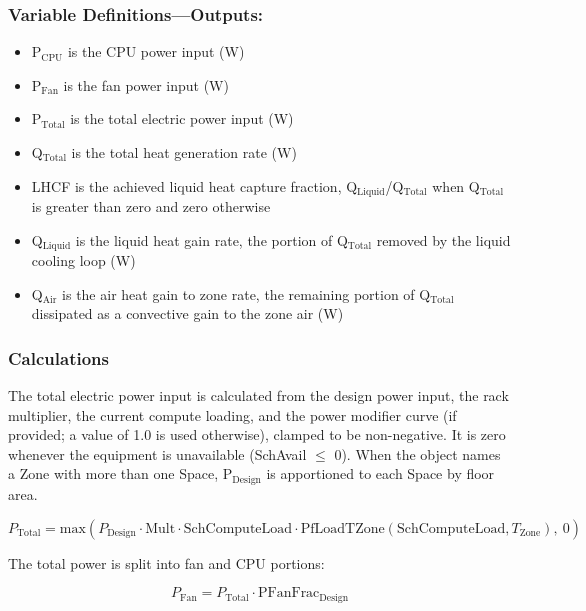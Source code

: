 \subsubsection{Variable Definitions---Outputs:}\label{variable-definitions-outputs-liquidcooled}

\begin{itemize}
\tightlist
\item
  P$_\textrm{CPU}$ is the CPU power input (W)
\item
  P$_\textrm{Fan}$ is the fan power input (W)
\item
  P$_\textrm{Total}$ is the total electric power input (W)
\item
  Q$_\textrm{Total}$ is the total heat generation rate (W)
\item
  LHCF is the achieved liquid heat capture fraction, Q$_\textrm{Liquid}$/Q$_\textrm{Total}$ when Q$_\textrm{Total}$ is greater than zero and zero otherwise
\item
  Q$_\textrm{Liquid}$ is the liquid heat gain rate, the portion of Q$_\textrm{Total}$ removed by the liquid cooling loop (W)
\item
  Q$_\textrm{Air}$ is the air heat gain to zone rate, the remaining portion of Q$_\textrm{Total}$ dissipated as a convective gain to the zone air (W)
\end{itemize}

\subsubsection{Calculations}\label{calculations-liquidcooled}

The total electric power input is calculated from the design power input, the rack multiplier, the current compute loading, and the power modifier curve (if provided; a value of 1.0 is used otherwise), clamped to be non-negative. It is zero whenever the equipment is unavailable (SchAvail $\leq$ 0). When the object names a Zone with more than one Space, P$_\textrm{Design}$ is apportioned to each Space by floor area.

\begin{equation}
P_{\textrm{Total}} = \textrm{max}\left(P_{\textrm{Design}} \cdot \textrm{Mult} \cdot \textrm{SchComputeLoad} \cdot \textrm{PfLoadTZone}(\textrm{SchComputeLoad}, T_{\textrm{Zone}}),\ 0\right)
\end{equation}

The total power is split into fan and CPU portions:

\begin{equation}
P_{\textrm{Fan}} = P_{\textrm{Total}} \cdot \textrm{PFanFrac}_{\textrm{Design}}
\end{equation}

